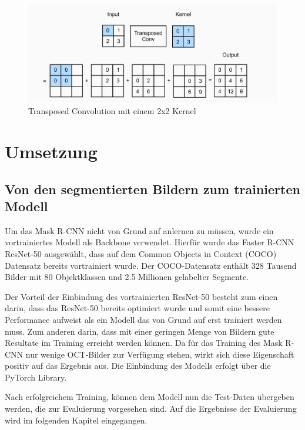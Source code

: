 \begin{figure}[H]
\centering
\includegraphics[width=\textwidth]{pic/Segmentierung/TransposedConvolution.png}
\caption{\label{pic:TransposedConvolution} Transposed Convolution mit einem 2x2 Kernel}
\end{figure}

\newpage
\section{Umsetzung}
\subsection{Von den segmentierten Bildern zum trainierten Modell}



Um das Mask R-CNN nicht von Grund auf anlernen zu müssen, wurde ein vortrainiertes Modell als Backbone verwendet. Hierfür wurde das Faster R-CNN ResNet-50 ausgewählt, dass auf dem Common Objects in Context (COCO) Datensatz bereits vortrainiert wurde. 
Der COCO-Datensatz enthält 328 Tausend Bilder mit 80 Objektklassen und 2.5 Millionen gelabelter Segmente. \cite{16}


Der Vorteil der Einbindung des vortrainierten ResNet-50 besteht zum einen darin, dass das ResNet-50 bereits optimiert wurde und somit eine bessere Performance aufweist als ein Modell das von Grund auf erst trainiert werden muss. %
Zum anderen darin, dass mit einer geringen Menge von Bildern gute Resultate im Training erreicht werden können. Da für das Training des Mask R-CNN nur wenige OCT-Bilder zur Verfügung stehen, wirkt sich diese Eigenschaft positiv auf das Ergebnis aus. Die Einbindung des Modells erfolgt über die PyTorch Library.


Nach erfolgreichem Training, können dem Modell nun die Test-Daten übergeben werden, die zur Evaluierung vorgesehen sind.
Auf die Ergebnisse der Evaluierung wird im folgenden Kapitel eingegangen. 

